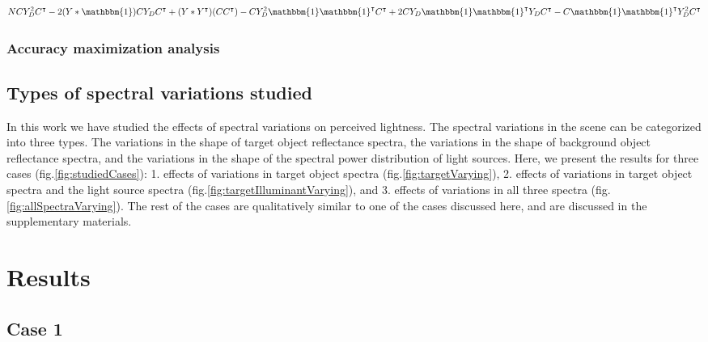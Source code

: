 \documentclass{jov}
\begin{document}
\begin{align}
N C Y_D^2 C^\intercal - 2(Y*\mathbbm{1})C Y_D C^\intercal + (Y*Y^\intercal) (CC^\intercal)-C Y_{D}^2\mathbbm{1}\mathbbm{1}^\intercal C^\intercal +2 C Y_{D} \mathbbm{1}\mathbbm{1}^\intercal Y_{D} C^\intercal - C \mathbbm{1}\mathbbm{1}^\intercal Y_{D}^2 C^\intercal
\end{align} 



\subsubsection*{Accuracy maximization analysis}

\subsection{Types of spectral variations studied}
In this work we have studied the effects of spectral variations on perceived lightness. The spectral variations in the scene can be categorized into three types. The variations in the shape of target object reflectance spectra, the variations in the shape of background object reflectance spectra, and the variations in the shape of the spectral power distribution of light sources. Here, we present the results for three cases (fig.\ref{fig:studiedCases}): 1. effects of variations in target object spectra (fig.\ref{fig:targetVarying}), 2. effects of variations in target object spectra and the light source spectra (fig.\ref{fig:targetIlluminantVarying}), and 3. effects of variations in all three spectra (fig.\ref{fig:allSpectraVarying}). The rest of the cases are qualitatively similar to one of the cases discussed here, and are discussed in the supplementary materials. 


\section{Results}
\subsection{Case 1}
\end{document}
